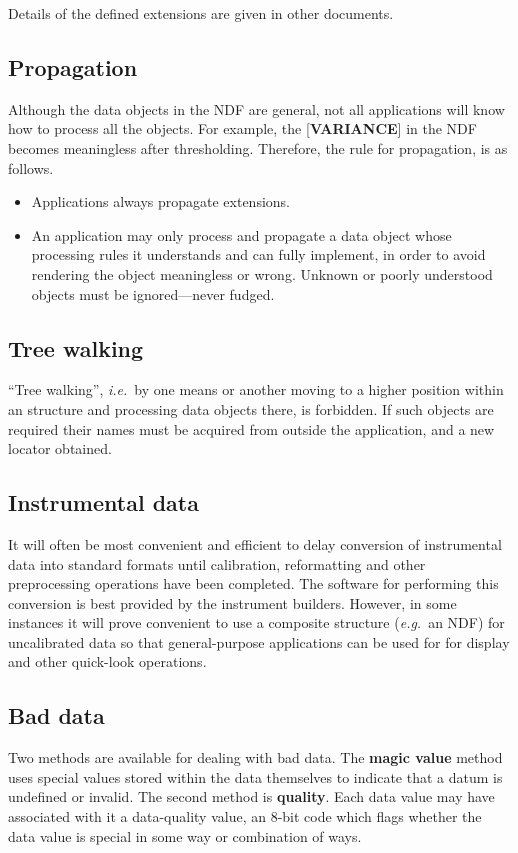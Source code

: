 \documentclass[twoside,11pt,nolof,noabs]{starlink}
\begin{document}
Details of the defined extensions are given in other documents.

\subsection*{Propagation}
Although the data objects in the NDF are general, not all applications
will know how to process all the objects.  For example, the {[}\textbf{VARIANCE}{]}
in the NDF becomes meaningless after thresholding.
Therefore, the rule for propagation,
is as follows.
\begin{itemize}
\item
Applications always propagate extensions.
\item
An application may only process and
propagate a data object whose processing rules it understands
and can fully implement, in order to avoid
rendering the object meaningless or wrong. Unknown or poorly
understood objects must be ignored---never fudged.
\end{itemize}

\subsection*{Tree walking}
``Tree walking'', \textit{i.e.}\  by one means or another moving to a higher
position within an structure and processing data objects there, is
forbidden. If such objects are required their names must be acquired
from outside the application, and a new locator obtained.

\subsection*{Instrumental data}
It will often be most convenient and efficient to delay conversion of
instrumental
data into standard formats until calibration,
reformatting and other preprocessing operations have been
completed.  The software for performing this
conversion is best provided by the
instrument builders.
However, in some instances it will prove
convenient to use a composite structure (\textit{e.g.}\
an NDF) for uncalibrated data so that
general-purpose applications can be used for
for display and other quick-look operations.

\subsection*{Bad data}
Two methods are available for dealing with bad data.  The
\textbf{magic value} method uses special values
stored within the data themselves to
indicate that a datum is undefined or invalid.  The second method is
\textbf{quality}.  Each data value may have associated with
it a data-quality value, an 8-bit
code which flags whether the data value is special
in some way or combination of ways.
\end{document}
